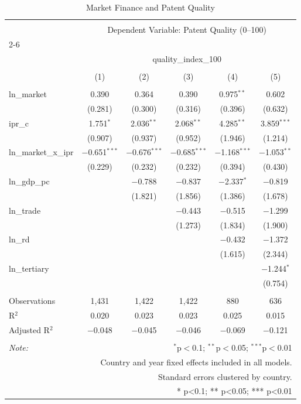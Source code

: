 
\begin{table}[!htbp] \centering 
  \caption{Market Finance and Patent Quality} 
  \label{} 
\begin{tabular}{@{\extracolsep{5pt}}lccccc} 
\\[-1.8ex]\hline 
\hline \\[-1.8ex] 
 & \multicolumn{5}{c}{Dependent Variable: Patent Quality (0–100)} \\ 
\cline{2-6} 
\\[-1.8ex] & \multicolumn{5}{c}{quality\_index\_100} \\ 
\\[-1.8ex] & (1) & (2) & (3) & (4) & (5)\\ 
\hline \\[-1.8ex] 
 ln\_market & 0.390 & 0.364 & 0.390 & 0.975$^{**}$ & 0.602 \\ 
  & (0.281) & (0.300) & (0.316) & (0.396) & (0.632) \\ 
  ipr\_c & 1.751$^{*}$ & 2.036$^{**}$ & 2.068$^{**}$ & 4.285$^{**}$ & 3.859$^{***}$ \\ 
  & (0.907) & (0.937) & (0.952) & (1.946) & (1.214) \\ 
  ln\_market\_x\_ipr & $-$0.651$^{***}$ & $-$0.676$^{***}$ & $-$0.685$^{***}$ & $-$1.168$^{***}$ & $-$1.053$^{**}$ \\ 
  & (0.229) & (0.232) & (0.232) & (0.394) & (0.430) \\ 
  ln\_gdp\_pc &  & $-$0.788 & $-$0.837 & $-$2.337$^{*}$ & $-$0.819 \\ 
  &  & (1.821) & (1.856) & (1.386) & (1.678) \\ 
  ln\_trade &  &  & $-$0.443 & $-$0.515 & $-$1.299 \\ 
  &  &  & (1.273) & (1.834) & (1.900) \\ 
  ln\_rd &  &  &  & $-$0.432 & $-$1.372 \\ 
  &  &  &  & (1.615) & (2.344) \\ 
  ln\_tertiary &  &  &  &  & $-$1.244$^{*}$ \\ 
  &  &  &  &  & (0.754) \\ 
 \hline \\[-1.8ex] 
Observations & 1,431 & 1,422 & 1,422 & 880 & 636 \\ 
R$^{2}$ & 0.020 & 0.023 & 0.023 & 0.025 & 0.015 \\ 
Adjusted R$^{2}$ & $-$0.048 & $-$0.045 & $-$0.046 & $-$0.069 & $-$0.121 \\ 
\hline 
\hline \\[-1.8ex] 
\textit{Note:}  & \multicolumn{5}{r}{$^{*}$p$<$0.1; $^{**}$p$<$0.05; $^{***}$p$<$0.01} \\ 
 & \multicolumn{5}{r}{Country and year fixed effects included in all models.} \\ 
 & \multicolumn{5}{r}{Standard errors clustered by country.} \\ 
 & \multicolumn{5}{r}{* p<0.1; ** p<0.05; *** p<0.01} \\ 
\end{tabular} 
\end{table} 
